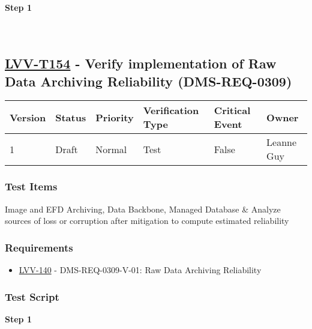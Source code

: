 \textbf{Step 1}\\
~\\
~\\

\hypertarget{lvv-t154---verify-implementation-of-raw-data-archiving-reliability-dms-req-0309}{%
\subsection{\texorpdfstring{\href{https://jira.lsstcorp.org/secure/Tests.jspa\#/testCase/LVV-T154}{LVV-T154}
- Verify implementation of Raw Data Archiving Reliability
(DMS-REQ-0309)}{LVV-T154 - Verify implementation of Raw Data Archiving Reliability (DMS-REQ-0309)}}\label{lvv-t154---verify-implementation-of-raw-data-archiving-reliability-dms-req-0309}}

\begin{longtable}[]{@{}llllll@{}}
\toprule
Version & Status & Priority & Verification Type & Critical Event &
Owner\tabularnewline
\midrule
\endhead
1 & Draft & Normal & Test & False & Leanne Guy\tabularnewline
\bottomrule
\end{longtable}

\hypertarget{test-items-54}{%
\subsubsection{Test Items}\label{test-items-54}}

Image and EFD Archiving, Data Backbone, Managed Database \& Analyze
sources of loss or corruption after mitigation to compute estimated
reliability

\hypertarget{requirements-54}{%
\subsubsection{Requirements}\label{requirements-54}}

\begin{itemize}
\tightlist
\item
  \href{https://jira.lsstcorp.org/browse/LVV-140}{LVV-140} -
  DMS-REQ-0309-V-01: Raw Data Archiving Reliability
\end{itemize}

\hypertarget{test-script-54}{%
\subsubsection{Test Script}\label{test-script-54}}

\textbf{Step 1}\\
~\\
~\\

